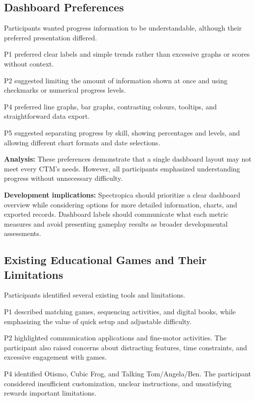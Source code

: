 \documentclass[12pt, titlepage]{article}
\begin{document}
\subsection{Dashboard Preferences}

Participants wanted progress information to be understandable, although their preferred presentation differed.

P1 preferred clear labels and simple trends rather than excessive graphs or scores without context.

P2 suggested limiting the amount of information shown at once and using checkmarks or numerical progress levels.

P4 preferred line graphs, bar graphs, contrasting colours, tooltips, and straightforward data export.

P5 suggested separating progress by skill, showing percentages and levels, and allowing different chart formats and date selections.

\noindent\textbf{Analysis:} These preferences demonstrate that a single dashboard layout may not meet every CTM's needs. However, all participants emphasized understanding progress without unnecessary difficulty.

\noindent\textbf{Development implications:} Spectropica should prioritize a clear dashboard overview while considering options for more detailed information, charts, and exported records. Dashboard labels should communicate what each metric measures and avoid presenting gameplay results as broader developmental assessments.

\subsection{Existing Educational Games and Their Limitations}

Participants identified several existing tools and limitations.

P1 described matching games, sequencing activities, and digital books, while emphasizing the value of quick setup and adjustable difficulty.

P2 highlighted communication applications and fine-motor activities. The participant also raised concerns about distracting features, time constraints, and excessive engagement with games.

P4 identified Otismo, Cubic Frog, and Talking Tom/Angela/Ben. The participant considered insufficient customization, unclear instructions, and unsatisfying rewards important limitations.
\end{document}
